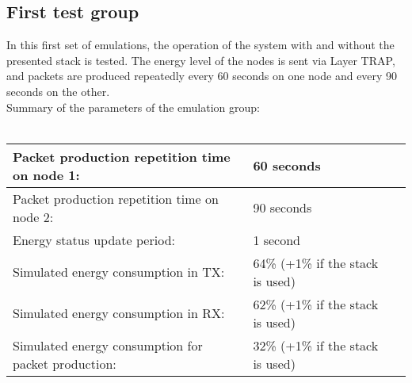 \subsection{First test group}
\label{sec:FT}
In this first set of emulations, the operation of the system with and without the presented stack is tested. The energy level of the nodes is sent via Layer TRAP, and packets are produced repeatedly every 60 seconds on one node and every 90 seconds on the other.\\
Summary of the parameters of the emulation group:\\\\
\begin{tabular}{lll} \hline
Packet production repetition time on node 1: & 60 seconds\\ \hline
Packet production repetition time on node 2: & 90 seconds\\ \hline
Energy status update period: & 1 second \\ \hline
Simulated energy consumption in TX: & 64\% (+1\% if the stack is used) \\ \hline
Simulated energy consumption in RX: & 62\% (+1\% if the stack is used)\\ \hline
Simulated energy consumption for packet production: & 32\% (+1\% if the stack is used)\\ \hline
\end{tabular}
